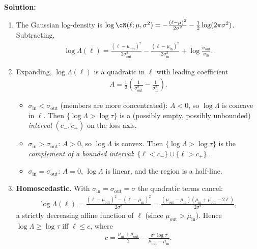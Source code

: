 \documentclass[12pt]{article}
\begin{document}
\begin{enumerate}
\begin{solution}
{\bf Solution:}\\
\begin{enumerate}
    \item The Gaussian log-density is $\log\cN(\ell; \mu, \sigma^2) = -\frac{(\ell - \mu)^2}{2\sigma^2} - \frac{1}{2}\log(2\pi\sigma^2)$. Subtracting,
    \begin{align*}
        \log\Lambda(\ell) = \frac{(\ell - \mu_{\mathrm{out}})^2}{2\sigma_{\mathrm{out}}^2} - \frac{(\ell - \mu_{\mathrm{in}})^2}{2\sigma_{\mathrm{in}}^2} + \log\frac{\sigma_{\mathrm{out}}}{\sigma_{\mathrm{in}}}.
    \end{align*}

    \item Expanding, $\log\Lambda(\ell)$ is a quadratic in $\ell$ with leading coefficient
    \begin{align*}
        A = \frac{1}{2}\left(\frac{1}{\sigma_{\mathrm{out}}^2} - \frac{1}{\sigma_{\mathrm{in}}^2}\right).
    \end{align*}
    \begin{itemize}
        \item $\sigma_{\mathrm{in}} < \sigma_{\mathrm{out}}$ (members are more concentrated): $A < 0$, so $\log\Lambda$ is concave in $\ell$. Then $\{\log\Lambda > \log\tau\}$ is a (possibly empty, possibly unbounded) \emph{interval} $(c_-, c_+)$ on the loss axis.
        \item $\sigma_{\mathrm{in}} > \sigma_{\mathrm{out}}$: $A > 0$, so $\log\Lambda$ is convex. Then $\{\log\Lambda > \log\tau\}$ is the \emph{complement of a bounded interval}: $\{\ell < c_-\} \cup \{\ell > c_+\}$.
        \item $\sigma_{\mathrm{in}} = \sigma_{\mathrm{out}}$: $A = 0$, $\log\Lambda$ is linear, and the region is a half-line.
    \end{itemize}

    \item \textbf{Homoscedastic.} With $\sigma_{\mathrm{in}} = \sigma_{\mathrm{out}} = \sigma$ the quadratic terms cancel:
    \begin{align*}
        \log\Lambda(\ell) = \frac{(\ell - \mu_{\mathrm{out}})^2 - (\ell - \mu_{\mathrm{in}})^2}{2\sigma^2} = \frac{(\mu_{\mathrm{out}} - \mu_{\mathrm{in}})(\mu_{\mathrm{in}} + \mu_{\mathrm{out}} - 2\ell)}{2\sigma^2},
    \end{align*}
    a strictly decreasing affine function of $\ell$ (since $\mu_{\mathrm{out}} > \mu_{\mathrm{in}}$). Hence $\log\Lambda \ge \log\tau$ iff $\ell \le c$, where
    \begin{align*}
        c = \frac{\mu_{\mathrm{in}} + \mu_{\mathrm{out}}}{2} - \frac{\sigma^2 \log\tau}{\mu_{\mathrm{out}} - \mu_{\mathrm{in}}}.
    \end{align*}


\end{enumerate}
\end{solution}
\end{enumerate}
\end{document}
